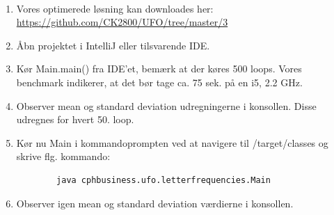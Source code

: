 \documentclass{article}
\begin{document}
\paragraph{}
\begin{enumerate}
    \item Vores optimerede løsning kan downloades her: \\ \url{https://github.com/CK2800/UFO/tree/master/3}
    \item Åbn projektet i IntelliJ eller tilsvarende IDE.
    \item Kør Main.main() fra IDE'et, bemærk at der køres 500 loops. Vores benchmark indikerer, at det bør tage ca. 75 sek. på en i5, 2.2 GHz.
    \item Observer mean og standard deviation udregningerne i konsollen. Disse udregnes for hvert 50. loop.
    \item Kør nu Main i kommandoprompten ved at navigere til /target/classes og skrive flg. kommando:
    \begin{verbatim}
        java cphbusiness.ufo.letterfrequencies.Main
    \end{verbatim}
    \item Observer igen mean og standard deviation værdierne i konsollen.
\newpage

\end{enumerate}
\end{document}
